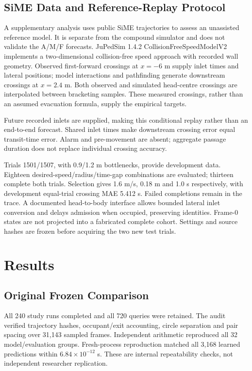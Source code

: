 \subsection{SiME Data and Reference-Replay Protocol}
A supplementary analysis uses public SiME trajectories \cite{SIME} to assess an unassisted reference model. It is separate from the compound simulator and does not validate the A/M/F forecasts. JuPedSim 1.4.2 CollisionFreeSpeedModelV2 implements a two-dimensional collision-free speed approach \cite{CFS} with recorded wall geometry. Observed first-forward crossings at $x=-6$ m supply inlet times and lateral positions; model interactions and pathfinding generate downstream crossings at $x=2.4$ m. Both observed and simulated head-centre crossings are interpolated between bracketing samples. These measured crossings, rather than an assumed evacuation formula, supply the empirical targets.

Future recorded inlets are supplied, making this conditional replay rather than an end-to-end forecast. Shared inlet times make downstream crossing error equal transit-time error. Alarm and pre-movement are absent; aggregate passage duration does not replace individual crossing accuracy.

Trials 1501/1507, with 0.9/1.2 m bottlenecks, provide development data. Eighteen desired-speed/radius/time-gap combinations are evaluated; thirteen complete both trials. Selection gives 1.6 m/s, 0.18 m and 1.0 s respectively, with development equal-trial crossing MAE 5.412 s. Failed completions remain in the trace. A documented head-to-body interface allows bounded lateral inlet conversion and delays admission when occupied, preserving identities. Frame-0 states are not projected into a fabricated complete cohort. Settings and source hashes are frozen before acquiring the two new test trials.

\section{Results}
\subsection{Original Frozen Comparison}
All 240 study runs completed and all 720 queries were retained. The audit verified trajectory hashes, occupant/exit accounting, circle separation and pair spacing over 31,143 sampled frames. Independent arithmetic reproduced all 32 model/evaluation groups. Fresh-process reproduction matched all 3,168 learned predictions within $6.84\times10^{-12}$ s. These are internal repeatability checks, not independent researcher replication.

